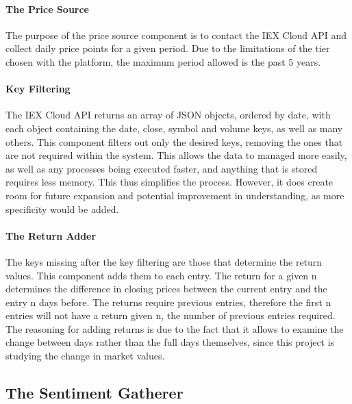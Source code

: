 \paragraph{The Price Source}

The purpose of the price source component is to contact the IEX Cloud API and collect daily price points for a given period. Due to the limitations of the tier chosen with the platform, the maximum period allowed is the past 5 years.

\paragraph{Key Filtering}

The IEX Cloud API returns an array of JSON objects, ordered by date, with each object containing the date, close, symbol and volume keys, as well as many others. This component filters out only the desired keys, removing the ones that are not required within the system. This allows the data to managed more easily, as well as any processes being executed faster, and anything that is stored requires less memory. This thus simplifies the process. However, it does create room for future expansion and potential improvement in understanding, as more specificity would be added.

\paragraph{The Return Adder}

The keys missing after the key filtering are those that determine the return values. This component adds them to each entry. The return for a given n determines the difference in closing prices between the current entry and the entry n days before. The returns require previous entries, therefore the first n entries will not have a return given n, the number of previous entries required. The reasoning for adding returns is due to the fact that it allows to examine the change between days rather than the full days themselves, since this project is studying the change in market values.

\subsection{The Sentiment Gatherer}

